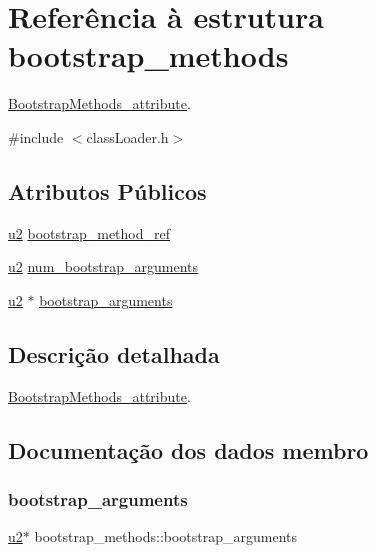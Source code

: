 \hypertarget{structbootstrap__methods}{}\section{Referência à estrutura bootstrap\+\_\+methods}
\label{structbootstrap__methods}


\hyperlink{struct_bootstrap_methods__attribute}{Bootstrap\+Methods\+\_\+attribute}.  




{\ttfamily \#include $<$class\+Loader.\+h$>$}

\subsection*{Atributos Públicos}
\begin{DoxyCompactItemize}
\item 
\hyperlink{util_8h_a55ef8d87fd202b8417704c089899c5b9}{u2} \hyperlink{structbootstrap__methods_a480411f5ca41d770aa9ce24ee7e8e1e8}{bootstrap\+\_\+method\+\_\+ref}
\item 
\hyperlink{util_8h_a55ef8d87fd202b8417704c089899c5b9}{u2} \hyperlink{structbootstrap__methods_aad28739e25a094400551fd1080fdb1f6}{num\+\_\+bootstrap\+\_\+arguments}
\item 
\hyperlink{util_8h_a55ef8d87fd202b8417704c089899c5b9}{u2} $\ast$ \hyperlink{structbootstrap__methods_a2204bb6639e44938bda3b11fbb32dd10}{bootstrap\+\_\+arguments}
\end{DoxyCompactItemize}


\subsection{Descrição detalhada}
\hyperlink{struct_bootstrap_methods__attribute}{Bootstrap\+Methods\+\_\+attribute}. 

\subsection{Documentação dos dados membro}
\mbox{\label{structbootstrap__methods_a2204bb6639e44938bda3b11fbb32dd10}} 
\subsubsection{\texorpdfstring{bootstrap\+\_\+arguments}{bootstrap\_arguments}}
{\footnotesize\ttfamily \hyperlink{util_8h_a55ef8d87fd202b8417704c089899c5b9}{u2}$\ast$ bootstrap\+\_\+methods\+::bootstrap\+\_\+arguments}

